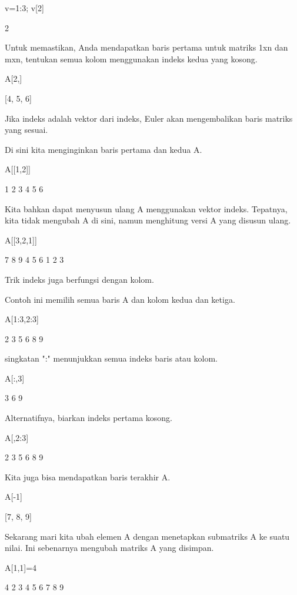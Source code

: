\documentclass{article}
\begin{document}
\>v=1:3; v[2]


    2

Untuk memastikan, Anda mendapatkan baris pertama untuk matriks 1xn dan
mxn, tentukan semua kolom menggunakan indeks kedua yang kosong.


\>A[2,]


    [4,  5,  6]

Jika indeks adalah vektor dari indeks, Euler akan mengembalikan baris
matriks yang sesuai.


Di sini kita menginginkan baris pertama dan kedua A.


\>A[[1,2]]


                1             2             3 
                4             5             6 

Kita bahkan dapat menyusun ulang A menggunakan vektor indeks.
Tepatnya, kita tidak mengubah A di sini, namun menghitung versi A yang
disusun ulang.


\>A[[3,2,1]]


                7             8             9 
                4             5             6 
                1             2             3 

Trik indeks juga berfungsi dengan kolom.


Contoh ini memilih semua baris A dan kolom kedua dan ketiga.


\>A[1:3,2:3]


                2             3 
                5             6 
                8             9 

\Untuk singkatan ":" menunjukkan semua indeks baris atau kolom.


\>A[:,3]


                3 
                6 
                9 

Alternatifnya, biarkan indeks pertama kosong.


\>A[,2:3]


                2             3 
                5             6 
                8             9 

Kita juga bisa mendapatkan baris terakhir A.


\>A[-1]


    [7,  8,  9]

Sekarang mari kita ubah elemen A dengan menetapkan submatriks A ke
suatu nilai. Ini sebenarnya mengubah matriks A yang disimpan.


\>A[1,1]=4


                4             2             3 
                4             5             6 
                7             8             9 
\end{document}
